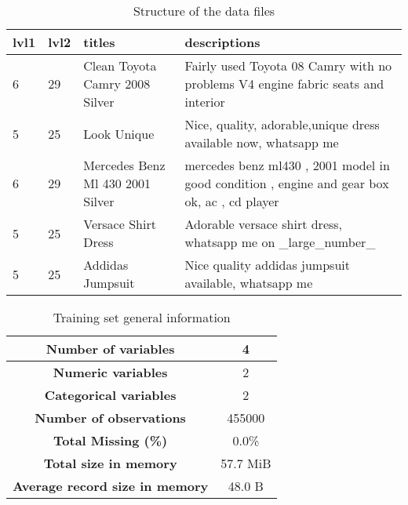 \begin{table}[]
	\centering
	\caption{Structure of the data files}
	\label{data_structure}
	\begin{tabular}{| p{1cm} | p{1cm} | p{3cm} | p{7cm} |}
		\hline
		\textbf{lvl1} & \textbf{lvl2} & \textbf{titles}                  & \textbf{descriptions}                                                                       \\ \hline
		6             & 29            & Clean Toyota Camry 2008 Silver   & Fairly used Toyota 08 Camry with no problems V4 engine fabric seats and interior            \\ \hline
		5             & 25            & Look Unique                      & Nice, quality, adorable,unique dress available now, whatsapp me                             \\ \hline
		6             & 29            & Mercedes Benz Ml 430 2001 Silver & mercedes benz ml430 , 2001 model in good condition , engine and gear box ok, ac , cd player \\ \hline
		5             & 25            & Versace Shirt Dress              & Adorable versace shirt dress, whatsapp me on \_large\_number\_                              \\ \hline
		5             & 25            & Addidas Jumpsuit                 & Nice quality addidas jumpsuit available, whatsapp me                                        \\ \hline
	\end{tabular}
\end{table}


\begin{table}[h]
	\centering
	\caption{Training set general information}
	\label{general}
	\begin{tabular}{|c|c|}
		\hline
	\textbf{	Number of variables     }      & 4      \\
		\hline
	\textbf{	Numeric variables}	 		  & 2		 \\
		\hline
	\textbf{	Categorical	variables} 		  & 2		 \\
		\hline
		\textbf{Number of observations }       & 455000  \\
		\hline
		\textbf{Total Missing (\%) }           & 0.0\%    \\
		\hline
		\textbf{Total size in memory }         & 57.7 MiB \\
		\hline
		\textbf{Average record size in memory} & 48.0 B  \\
		\hline
	\end{tabular}
\end{table}


